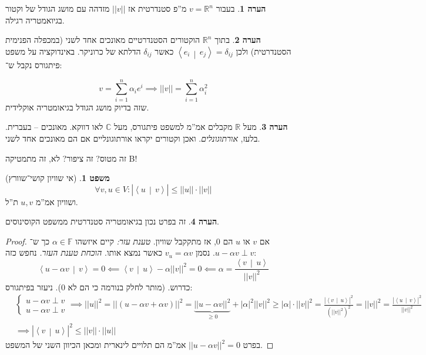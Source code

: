 \documentclass[a4paper]{article}
\newcommand\R     {\mathbb{R}}
\newcommand\C     {\mathbb{C}}
\newcommand\ra    {\rangle}
\newcommand\la    {\langle}
\newcommand\F         {\mathbb{F}}
\newcommand\co        {\colon}
\newcommand\norm[1]   {\left \vert \left \vert #1 \right \vert \right \vert}
\newcommand\mut [2]   {\left \la #1 \,\middle\vert\, #2 \right \ra}
\newcommand\ag        {\alpha}
\newcommand\dequad    {\!\!\!\!\!\!}
\theoremstyle{definition}
\newtheorem{Theorem}{משפט}
\newtheorem{Remark}{הערה}
\newcommand\theo  [1] {\begin{Theorem}#1\end{Theorem}}
\newcommand\rmark [1] {\begin{Remark}#1\end{Remark}}
\begin{document}
	\rmark{בעבור $v = \R^n$ מ''פ סטנדרטית אז $\norm{v}$ מזדהה עם מושג הגודל של וקטור בגיואמטריה רגילה. }
	
	\rmark{בתוך $\R^n$ הוקטורים הסטנדרטיים מאונכים אחד לשני (במכפלה הפנימית הסטנדרטית) ולכן $\mut{e_i}{e_j} = \delta_{ij}$ כאשר $\delta_{ij}$ הדלתא של כרוניקר. באינדוקציה על משפט פיתגורס נקבל ש־: }
	
	\[ v = \sum_{i = 1}^{n}\ag_i e^i \implies \norm{v} = \sum_{i = 1}^{n}\ag_i^2 \]
	שזה בדיוק מושג הגודל בגיאומטריה אוקלידית. 
	
	\rmark{מעל $\R$ מקבלים אמ''מ למשפט פיתגורס, מעל $\C$ לאו דווקא. מאונכים – בעברית. בלעז, \textit{אורתוגונלים}. ואכן וקטורים יקראו אורתוגונליים אם הם מאונכים אחד לשני. }
	
	זה מטוס? זה ציפור? לא, זה מתמטיקה B!
	\theo{(אי שוויון קושי־שוורץ)
		\[ \forall v, u \in V \co |\mut{u}{v}| \le \norm{u}\cdot\norm{v} \]
		ושוויון אמ''מ $u, v$ ת''ל. }
	\rmark{זה בפרט נכון בגיאומטריה סטנדרטית ממשפט הקוסינוסים. }
	
	\begin{proof}
		אם $v$ או $u$ הם $0$, אז מתקקבל שוויון. 
		\textit{טענת עזר: }קיים איזשהו $\ag \in \F$ כך ש־$u - \ag v \perp v$. נסמן $v_u = \ag v$ כאשר נמצא אותו. 
		\textit{הוכחת טענת העזר. }נחפש כזה: 
		\[ \mut{u - \ag v}{v} = 0 \impliedby \mut{v}{u} - \ag \norm{v}^2 = 0 \impliedby \ag = \frac{\mut{v}{u}}{\norm{v}^2} \]
		כדרוש. (מותר לחלק בנורמה כי הם לא $0$). ניעזר בפיתגורס: 
		\begin{align*}
			&\begin{cases}
				u - \ag v \perp v \\ u - \ag v \perp v
			\end{cases}\dequad \implies \norm{u}^2 = \norm{(u - \ag v + \ag v)}^2 = \underbrace{\norm{u - \ag v}^2}_{\ge 0} + |\ag|^2\norm{v}^2 \ge |\ag|\cdot\norm{v}^2 = \frac{|\mut{v}{u}|^2}{(\norm{v}^2)^2} = \norm{v}^2 = \frac{|\mut{u}{v}|^2}{\norm{v}^2} \\ &\implies |\mut{v}{u}|^2 \le \norm{v} \cdot \norm{u}
		\end{align*}
		בפרט $\norm{u - \ag v}^2 = 0$ אמ''מ הם תלויים לינארית ומכאן הכיוון השני של המשפט. 
	\end{proof}
	
\end{document}
